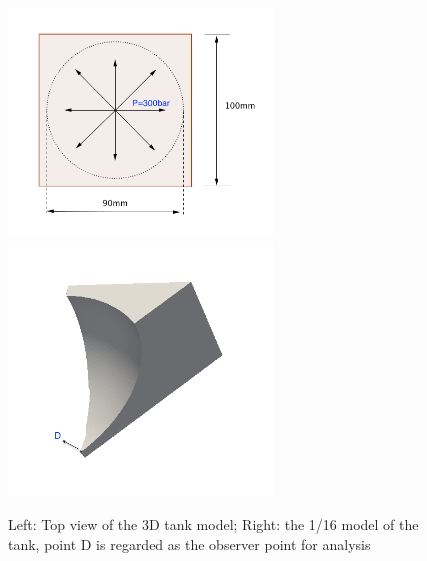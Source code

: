\begin{figure}[htbp]
	\begin{center}	
		\includegraphics[width=7cm,clip]{threeDmodel1.png} 
	    \includegraphics[width=7cm,clip]{threeDmodel2.png} 			
		\caption{Left: Top view of the 3D tank model; Right: the 1/16 model of the tank, point D is regarded as the observer point for analysis} \label{fig: threeDmodel}
	\end{center}
\end{figure}

